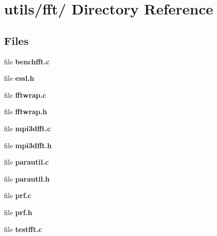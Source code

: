 \section{utils/fft/ Directory Reference}
\label{dir_04f154da9a25a56fd6115ced85096978}
\subsection*{Files}
\begin{CompactItemize}
\item 
file {\bf benchfft.c}
\item 
file {\bf essl.h}
\item 
file {\bf fftwrap.c}
\item 
file {\bf fftwrap.h}
\item 
file {\bf mpi3dfft.c}
\item 
file {\bf mpi3dfft.h}
\item 
file {\bf parautil.c}
\item 
file {\bf parautil.h}
\item 
file {\bf prf.c}
\item 
file {\bf prf.h}
\item 
file {\bf testfft.c}
\end{CompactItemize}
